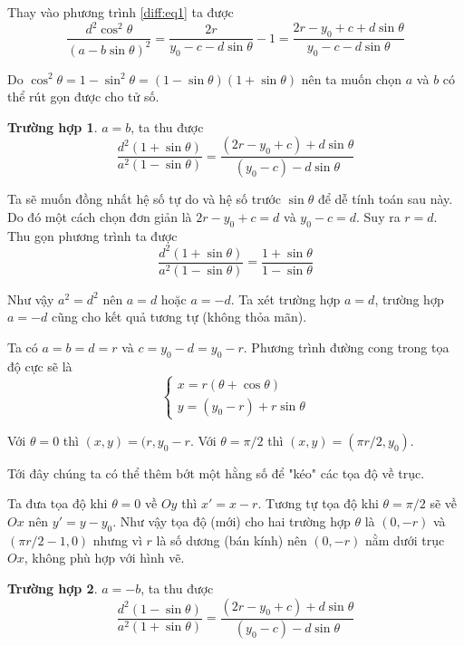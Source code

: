 \documentclass{mynotes}
\begin{document}
Thay vào phương trình \ref{diff:eq1} ta được
\begin{equation*}
    \frac{d^2 \cos^2 \theta}{(a - b \sin \theta)^2} = \frac{2 r}{y_0 - c - d \sin \theta} - 1 = \frac{2 r - y_0 + c + d \sin \theta}{y_0 - c - d \sin \theta}
\end{equation*}

Do $\cos^2 \theta = 1 - \sin^2 \theta = (1 - \sin \theta)(1 + \sin \theta)$ nên ta muốn chọn $a$ và $b$ có thể rút gọn được cho tử số. 

\textbf{Trường hợp 1}. $a = b$, ta thu được
\begin{equation*}
    \frac{d^2 (1 + \sin \theta)}{a^2 (1 - \sin \theta)} = \frac{(2 r - y_0 + c) + d \sin \theta}{(y_0 - c) - d \sin \theta}
\end{equation*}

Ta sẽ muốn đồng nhất hệ số tự do và hệ số trước $\sin \theta$ để dễ tính toán sau này. Do đó một cách chọn đơn giản là $2 r - y_0 + c = d$ và $y_0 - c = d$. Suy ra $r = d$. Thu gọn phương trình ta được
\begin{equation*}
    \frac{d^2 (1 + \sin \theta)}{a^2 (1 - \sin \theta)} = \frac{1 + \sin \theta}{1 - \sin \theta}
\end{equation*}

Như vậy $a^2 = d^2$ nên $a = d$ hoặc $a = -d$. Ta xét trường hợp $a = d$, trường hợp $a = -d$ cũng cho kết quả tương tự (không thỏa mãn). 

Ta có  $a = b = d = r$ và $c = y_0 - d = y_0 - r$. Phương trình đường cong trong tọa độ cực sẽ là
\begin{equation*}
    \begin{cases}
        x = r(\theta + \cos \theta) \\ y = (y_0 - r) + r \sin \theta
    \end{cases}
\end{equation*}

Với $\theta = 0$ thì $(x, y) = (r, y_0 - r$. Với $\theta = \pi / 2$ thì $(x, y) = (\pi r / 2, y_0)$.

Tới đây chúng ta có thể thêm bớt một hằng số để "kéo" các tọa độ về trục. 

Ta đưa tọa độ khi $\theta = 0$ về $Oy$ thì $x' = x - r$. Tương tự tọa độ khi $\theta = \pi / 2$ sẽ về $Ox$ nên $y' = y - y_0$. Như vậy tọa độ (mới) cho hai trường hợp $\theta$ là $(0, -r)$ và $(\pi r / 2 - 1, 0)$ nhưng vì $r$ là số dương (bán kính) nên $(0, -r)$ nằm dưới trục $Ox$, không phù hợp với hình vẽ.

\textbf{Trường hợp 2}. $a = -b$, ta thu được
\begin{equation*}
    \frac{d^2 (1 - \sin\theta)}{a^2 (1 + \sin\theta)} = \frac{(2r - y_0 + c) + d \sin\theta}{(y_0 - c) - d \sin\theta}
\end{equation*}
\end{document}
